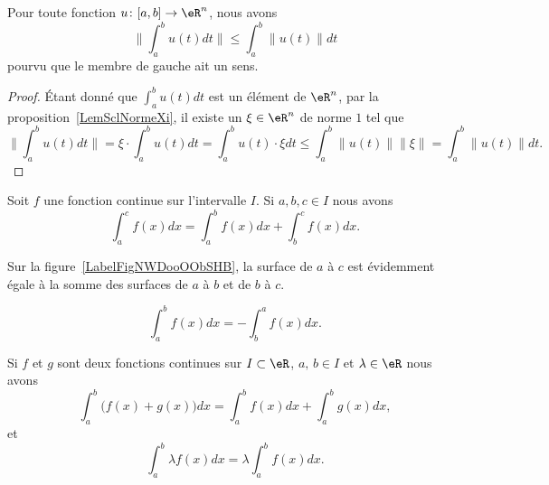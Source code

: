 \begin{lemma}			\label{LemIneqnormeintintnorm}
	Pour toute fonction \( u\colon \mathopen[ a , b \mathclose]\to \eR^n\), nous avons
	\begin{equation}
		\| \int_a^bu(t)dt\|\leq\int_a^b\| u(t) \|dt
	\end{equation}
	pourvu que le membre de gauche ait un sens.
\end{lemma}

\begin{proof}
	Étant donné que \( \int_a^bu(t)dt\) est un élément de \( \eR^n\), par la proposition~\ref{LemSclNormeXi}, il existe un \( \xi\in\eR^n\) de norme \( 1\) tel que
	\begin{equation}
		\| \int_a^bu(t)dt \|=\xi\cdot\int_a^b u(t)dt=\int_a^b u(t)\cdot\xi dt\leq\int_a^b\| u(t) \|   \| \xi \|=\int_a^b\| u(t) \|dt.
	\end{equation}
\end{proof}

\begin{proposition}
	Soit  \( f\) une fonction continue sur l'intervalle \( I\). Si \( a,b,c\in I\) nous avons
	\begin{equation}
		\int_a^cf(x)dx=\int_a^bf(x)dx+\int_b^cf(x)dx.
	\end{equation}
\end{proposition}

Sur la figure~\ref{LabelFigNWDooOObSHB}, la surface de \( a\) à \( c\) est évidemment égale à la somme des surfaces de \( a\) à \( b\) et de \( b\) à \( c\).
\newcommand{\CaptionFigNWDooOObSHB}{Illustration pour les relations de Chasles.}


\begin{corollary}
	\begin{equation}
		\int_a^bf(x)dx=-\int_b^af(x)dx.
	\end{equation}
\end{corollary}

\begin{proposition}\label{lineariteintegrale}
	Si \( f\) et \( g\) sont deux fonctions continues sur \( I\subset\eR\), \( a, \, b\in I\) et \( \lambda\in \eR\) nous avons
	\begin{equation}
		\int_a^b\big( f(x)+g(x) \big)dx=\int_a^bf(x)dx+\int_a^bg(x)dx,
	\end{equation}
	et
	\begin{equation}
		\int_a^b \lambda f(x)dx=\lambda\int_a^bf(x)dx.
	\end{equation}
\end{proposition}

